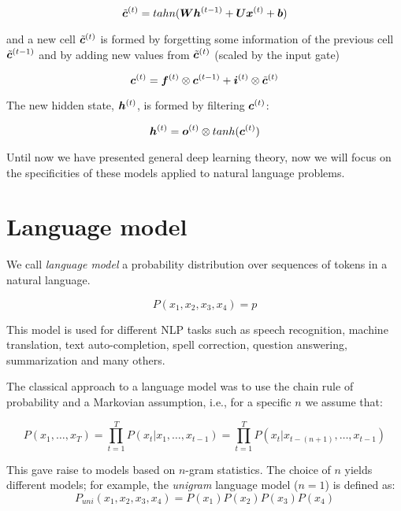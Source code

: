 \begin{equation}
\tilde{\bm{c}}^{(t)} = tahn(\bm{W} \bm{h}^{(t-1)} + \bm{U} \bm{x}^{(t)} + \bm{b})
\end{equation}

and a new cell $\tilde{\bm{c}}^{(t)}$ is formed by forgetting some information of the previous cell $\tilde{\bm{c}}^{(t-1)}$ and by adding new values from $\tilde{\bm{c}}^{(t)}$ (scaled by the input gate)

\begin{equation}
\bm{c}^{(t)} = \bm{f}^{(t)} \otimes \bm{c}^{(t-1)} + \bm{i}^{(t)}\otimes \tilde{\bm{c}}^{(t)}
\end{equation}

The new hidden state, $\bm{h}^{(t)}$, is formed by filtering $\bm{c}^{(t)}$:

\begin{equation}
\bm{h}^{(t)} = \bm{o}^{(t)} \otimes tanh(\bm{c}^{(t)})
\end{equation}


Until now we have presented general deep learning theory, now we will focus on the specificities of these models applied to natural language problems.


\section{Language model}

We call \textit{language model} a probability distribution over sequences of tokens in a natural language.

\[
P(x_1,x_2,x_3,x_4) = p
\]

This model is used for different NLP tasks such as speech recognition, machine translation, text auto-completion, spell correction, question answering, summarization and many others.

The classical approach to a language model was to use the chain rule of probability and a Markovian assumption, i.e., for a specific $n$ we assume that:

\begin{equation}
P(x_1, \dots, x_T) = \prod_{t=1}^{T} P(x_t \vert x_1, \dots, x_{t-1}) = \prod_{t=1}^{T} P(x_{t} \vert x_{t - (n+1)}, \dots, x_{t-1})
\end{equation} 


This gave raise to models based on $n$-gram statistics. The choice of $n$ yields different models; for example, the 
\textit{unigram} language model ($n=1$) is defined as: 
\begin{equation}
P_{uni}(x_1, x_2, x_3, x_4) = P(x_1)P(x_2)P(x_3)P(x_4)
\end{equation}

